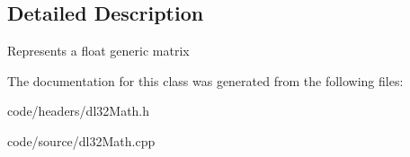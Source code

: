 \subsection{Detailed Description}
Represents a float generic matrix 

The documentation for this class was generated from the following files\-:\begin{DoxyCompactItemize}
\item 
code/headers/dl32\-Math.\-h\item 
code/source/dl32\-Math.\-cpp\end{DoxyCompactItemize}
